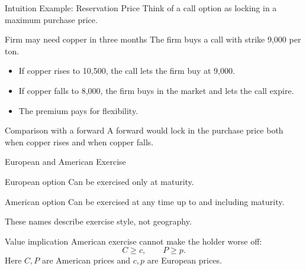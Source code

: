 \documentclass[aspectratio=169,11pt]{beamer}
\begin{document}
\begin{frame}{Intuition Example: Reservation Price}
    Think of a call option as locking in a maximum purchase price.

    \begin{exampleblock}{Firm may need copper in three months}
        The firm buys a call with strike 9,000 per ton.
        \begin{itemize}
            \item If copper rises to 10,500, the call lets the firm buy at 9,000.
            \item If copper falls to 8,000, the firm buys in the market and lets the call expire.
            \item The premium pays for flexibility.
        \end{itemize}
    \end{exampleblock}

    \begin{alertblock}{Comparison with a forward}
        A forward would lock in the purchase price both when copper rises and when copper falls.
    \end{alertblock}
\end{frame}

\begin{frame}{European and American Exercise}
    \begin{block}{European option}
        Can be exercised only at maturity.
    \end{block}

    \begin{block}{American option}
        Can be exercised at any time up to and including maturity.
    \end{block}

    \vspace{0.4em}
    These names describe exercise style, not geography.

    \begin{alertblock}{Value implication}
        American exercise cannot make the holder worse off:
        \[
            C\geq c,
            \qquad
            P\geq p.
        \]
        Here \(C,P\) are American prices and \(c,p\) are European prices.
    \end{alertblock}
\end{frame}
\end{document}
